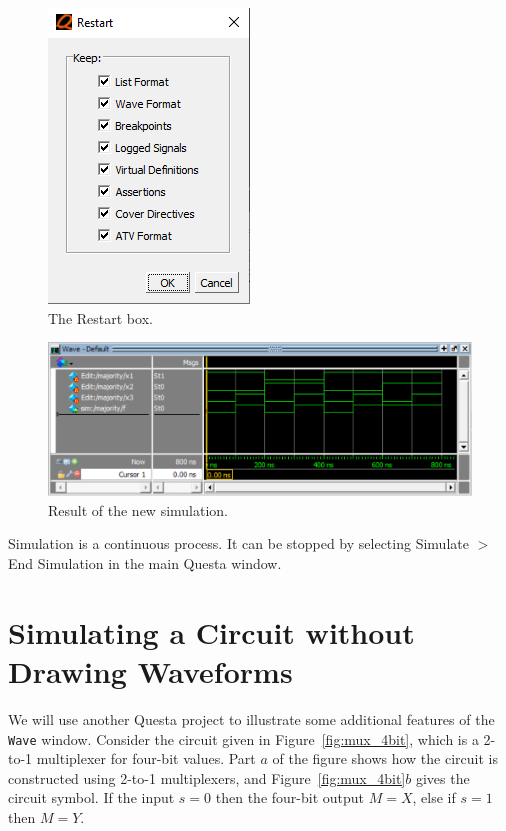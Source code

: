 \documentclass[11pt, twoside, pdftex]{article}
\begin{document}
\begin{figure}[H]
   \begin{center}
      \includegraphics[scale=0.8]{figures/figure29.png}
   \caption{The Restart box.} 
	 \label{fig:29}
	 \end{center}
\end{figure}

\begin{figure}[H]
   \begin{center}
      \includegraphics[scale=1.0]{figures/figure30.png}
   \caption{Result of the new simulation.} 
	 \label{fig:30}
	 \end{center}
\end{figure}

\noindent
Simulation is a continuous process. It can be stopped by selecting 
{\sf Simulate $>$ End Simulation} in the main Questa window.

\newpage
\section{Simulating a Circuit without Drawing Waveforms}

We will use another Questa project to illustrate some additional features
of the \texttt{Wave} window.  Consider the circuit given in Figure~\ref{fig:mux_4bit}, 
which is a 2-to-1 multiplexer for four-bit values. Part $a$ of the figure shows how the
circuit is constructed using 2-to-1 multiplexers, and Figure~\ref{fig:mux_4bit}$b$ gives 
the circuit symbol.  If the input $s = 0$ then the four-bit output $M = X$, 
else if $s = 1$ then $M = Y$. 
\end{document}
